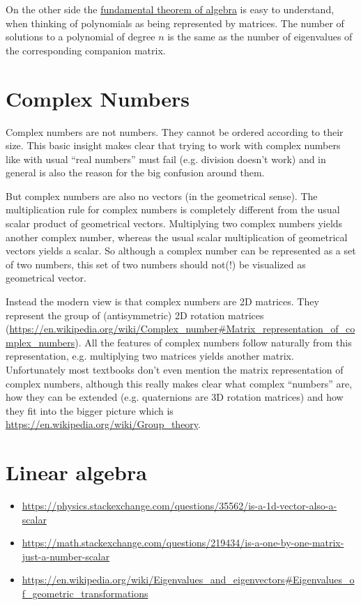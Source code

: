 On the other side the
\href{https://en.wikipedia.org/wiki/Fundamental_theorem_of_algebra}{fundamental
theorem of algebra} is easy to understand, when thinking of polynomials
as being represented by matrices. The number of solutions to a
polynomial of degree $n$ is the same as the number of eigenvalues of
the corresponding companion matrix.

\section{Complex Numbers}
Complex numbers are not numbers. They cannot be ordered according to their size. This basic insight makes clear that trying to work with complex numbers like with usual “real numbers” must fail (e.g. division doesn’t work) and in general is also the reason for the big confusion around them.

But complex numbers are also no vectors (in the geometrical sense). The multiplication rule for complex numbers is completely different from the usual scalar product of geometrical vectors. Multiplying two complex numbers yields another complex number, whereas the usual scalar multiplication of geometrical vectors yields a scalar. So although a complex number can be represented as a set of two numbers, this set of two numbers should not(!) be visualized as geometrical vector.

Instead the modern view is that complex numbers are 2D matrices. They represent the group of (antisymmetric) 2D rotation matrices (\url{https://en.wikipedia.org/wiki/Complex_number#Matrix_representation_of_complex_numbers}). All the features of complex numbers follow naturally from this representation, e.g. multiplying two matrices yields another matrix. Unfortunately most textbooks don’t even mention the matrix representation of complex numbers, although this really makes clear what complex “numbers” are, how they can be extended (e.g. quaternions are 3D rotation matrices) and how they fit into the bigger picture which is \url{https://en.wikipedia.org/wiki/Group_theory}.

\section{Linear algebra}

\begin{itemize}
\item \url{https://physics.stackexchange.com/questions/35562/is-a-1d-vector-also-a-scalar}
\item \url{https://math.stackexchange.com/questions/219434/is-a-one-by-one-matrix-just-a-number-scalar}
\item \url{https://en.wikipedia.org/wiki/Eigenvalues_and_eigenvectors#Eigenvalues_of_geometric_transformations}
\end{itemize}
